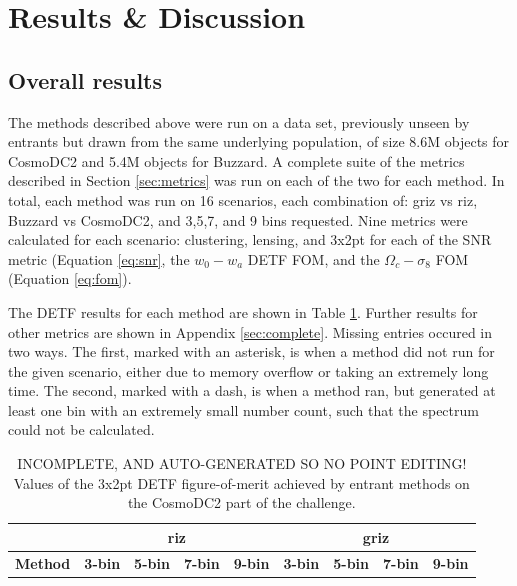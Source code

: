 \documentclass[twocolumn,twocolappendix]{aastex63}
\begin{document}
\section{Results \& Discussion}

\subsection{Overall results}
The methods described above were run on a data set, previously unseen by entrants but drawn
from the same underlying population, of size 8.6M objects for CosmoDC2 and 5.4M objects for Buzzard.
A complete suite of the metrics described in Section \ref{sec:metrics} was run on each of the two
for each method.  In total, each method was run on 16 scenarios, each combination of: griz vs riz,
Buzzard vs CosmoDC2, and 3,5,7, and 9 bins requested.  Nine metrics were calculated for each
scenario: clustering, lensing, and 3x2pt for each of the SNR metric (Equation \ref{eq:snr}, the $w_0-w_a$ 
DETF FOM, and the $\Omega_c - \sigma_8$ FOM (Equation \ref{eq:fom}).

The DETF results for each method are shown in Table \ref{tab:cosmodc2}.  Further results for other
metrics are shown in Appendix \ref{sec:complete}.  Missing entries occured in two ways.
The first, marked with an asterisk, is when a method did not run for the given scenario,
either due to memory overflow or taking an extremely long time.
The second, marked with a dash, is when a method ran, but generated at least one bin with an extremely 
small number count, such that the spectrum could not be calculated.




\begin{table}[]
\begin{tabular}{|l|llll|llll|}
                & \multicolumn{4}{c|}{\textbf{riz}}      & \multicolumn{4}{c|}{\textbf{griz}}                                \\ \hline
\textbf{Method} & \textbf{3-bin} & \textbf{5-bin} & \textbf{7-bin} & \textbf{9-bin} & \textbf{3-bin} & \textbf{5-bin} & \textbf{7-bin} & \textbf{9-bin} \\ \hline

\end{tabular}
\caption{INCOMPLETE, AND AUTO-GENERATED SO NO POINT EDITING! Values of the 3x2pt DETF figure-of-merit achieved by entrant methods on the 
CosmoDC2 part of the challenge.}
\label{tab:cosmodc2}
\end{table}
\end{document}
